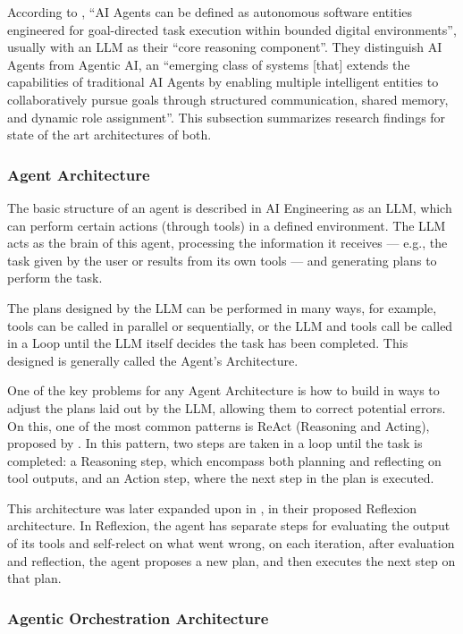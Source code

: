 \documentclass[a4paper]{report}
\begin{document}
According to \cite{sapkota2025aiagentsvsagentic}, ``AI Agents can be defined as autonomous software entities engineered for goal-directed task execution within bounded digital environments'', usually with an LLM as their ``core reasoning component''. They distinguish AI Agents from Agentic AI, an ``emerging class of systems [that] extends the capabilities of traditional AI Agents by enabling multiple intelligent entities to collaboratively pursue goals through structured communication, shared memory, and dynamic role assignment''. This subsection summarizes research findings for state of the art architectures of both.

\subsubsection{Agent Architecture}

The basic structure of an agent is described in AI Engineering as an LLM, which can perform certain actions (through tools) in a defined environment. The LLM acts as the brain of this agent, processing the information it receives --- e.g., the task given by the user or results from its own tools --- and generating plans to perform the task.

The plans designed by the LLM can be performed in many ways, for example, tools can be called in parallel or sequentially, or the LLM and tools call be called in a Loop until the LLM itself decides the task has been completed. This designed is generally called the Agent's Architecture.

One of the key problems for any Agent Architecture is how to build in ways to adjust the plans laid out by the LLM, allowing them to correct potential errors. On this, one of the most common patterns is ReAct (Reasoning and Acting), proposed by \cite{yao2023react}. In this pattern, two steps are taken in a loop until the task is completed: a Reasoning step, which encompass both planning and reflecting on tool outputs, and an Action step, where the next step in the plan is executed.

This architecture was later expanded upon in \cite{shinn2023reflexion}, in their proposed Reflexion architecture. In Reflexion, the agent has separate steps for evaluating the output of its tools and self-relect on what went wrong, on each iteration, after evaluation and reflection, the agent proposes a new plan, and then executes the next step on that plan.

\subsubsection{Agentic Orchestration Architecture}
\end{document}
